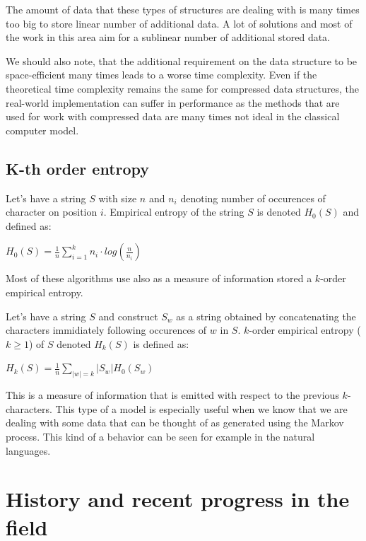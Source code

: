 The amount of data that these types of structures are dealing with is many times too big to store linear number of additional data. A lot of solutions and most of the work in this area aim for a sublinear number of additional stored data.

We should also note, that the additional requirement on the data structure to be space-efficient many times leads to a worse time complexity. Even if the theoretical time complexity remains the same for compressed data structures, the real-world implementation can suffer in performance as the methods that are used for work with compressed data are many times not ideal in the classical computer model.

\subsection{K-th order entropy}

\begin{theorem}
Let's have a string $S$ with size $n$ and $n_i$ denoting number of occurences of character
on position $i$. Empirical entropy of the string $S$ is denoted $H_0(S)$ and defined as:
\begin{center}
$H_0(S) = \frac{1}{n} \sum_{i=1}^{k} n_i\cdot log(\frac{n}{n_i})$
\end{center}
\end{theorem}

Most of these algorithms use also as a measure of information stored a $k$-order empirical entropy.

\begin{theorem}
Let's have a string $S$ and construct $S_w$ as a string obtained by concatenating the characters immidiately following occurences of $w$ in $S$.
$k$-order empirical entropy ($k \geq 1$) of $S$ denoted $H_k(S)$ is defined as:
\begin{center}
$H_k(S) = \frac{1}{n} \sum_{|w|=k} |S_w| H_0(S_w)$
\end{center}
\end{theorem}

This is a measure of information that is emitted with respect to the previous $k$-characters. This type of a model is especially useful when we know
that we are dealing with some data that can be thought of as generated using the Markov process. This kind of a behavior can be seen for example in the natural languages.

\section{History and recent progress in the field}

